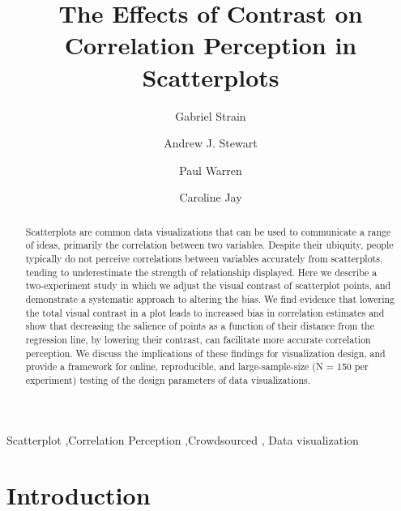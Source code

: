 \documentclass[preprint, 3p,
authoryear]{elsarticle} %
\begin{document}
\begin{frontmatter}

  \title{The Effects of Contrast on Correlation Perception in
Scatterplots}
    \author[CS]{Gabriel Strain%
  }
    \author[CS]{Andrew J. Stewart%
  }
    \author[SSS]{Paul Warren%
  }
    \author[CS]{Caroline Jay%
  }
  
  \begin{abstract}
  Scatterplots are common data visualizations that can be used to
  communicate a range of ideas, primarily the correlation between two
  variables. Despite their ubiquity, people typically do not perceive
  correlations between variables accurately from scatterplots, tending
  to underestimate the strength of relationship displayed. Here we
  describe a two-experiment study in which we adjust the visual contrast
  of scatterplot points, and demonstrate a systematic approach to
  altering the bias. We find evidence that lowering the total visual
  contrast in a plot leads to increased bias in correlation estimates
  and show that decreasing the salience of points as a function of their
  distance from the regression line, by lowering their contrast, can
  facilitate more accurate correlation perception. We discuss the
  implications of these findings for visualization design, and provide a
  framework for online, reproducible, and large-sample-size (N = 150 per
  experiment) testing of the design parameters of data visualizations.
  \end{abstract}
    \begin{keyword}
    Scatterplot \sep Correlation Perception \sep Crowdsourced \sep 
    Data visualization
  \end{keyword}
  
 \end{frontmatter}

\hypertarget{introduction}{%
\section{Introduction}\label{introduction}}
\end{document}

